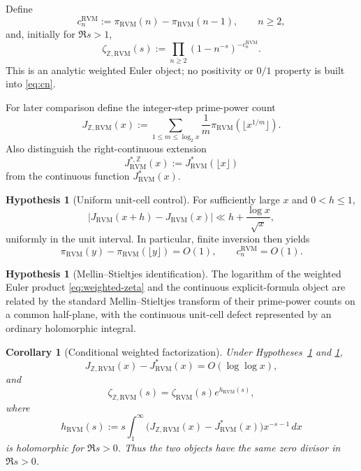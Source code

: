 \documentclass[11pt,reqno]{amsart}
\newtheorem{corollary}[theorem]{Corollary}
\theoremstyle{definition}
\newtheorem{hypothesis}[theorem]{Hypothesis}
\theoremstyle{remark}
\newcommand{\RVM}{\mathrm{RVM}}
\begin{document}
Define
\begin{equation}\label{eq:cn}
 c_n^{\RVM}:=\pi_{\RVM}(n)-\pi_{\RVM}(n-1),
 \qquad n\ge2,
\end{equation}
and, initially for $\Re s>1$,
\begin{equation}\label{eq:weighted-zeta}
 \zeta_{\mathbb Z,\RVM}(s)
 :=\prod_{n\ge2}(1-n^{-s})^{-c_n^{\RVM}}.
\end{equation}
This is an analytic weighted Euler object; no positivity or $0/1$ property is built into \eqref{eq:cn}.

For later comparison define the integer-step prime-power count
\begin{equation}\label{eq:JZ}
 J_{\mathbb Z,\RVM}(x)
 :=\sum_{1\le m\le\log_2x}\frac1m
 \pi_{\RVM}(\lfloor x^{1/m}\rfloor).
\end{equation}
Also distinguish the right-continuous extension
\begin{equation}
 J_{\RVM}^{*,\mathbb Z}(x):=J_{\RVM}^{*}(\lfloor x\rfloor)
\end{equation}
from the continuous function $J_{\RVM}^{*}(x)$.

\begin{hypothesis}[Uniform unit-cell control]\label{hyp:unit-cell}
For sufficiently large $x$ and $0<h\le1$,
\begin{equation}\label{eq:unit-cell}
 |J_{\RVM}(x+h)-J_{\RVM}(x)|
 \ll h+\frac{\log x}{\sqrt x},
\end{equation}
uniformly in the unit interval.  In particular, finite inversion then yields
\begin{equation}
 \pi_{\RVM}(y)-\pi_{\RVM}(\lfloor y\rfloor)=O(1),
 \qquad c_n^{\RVM}=O(1).
\end{equation}
\end{hypothesis}

\begin{hypothesis}[Mellin--Stieltjes identification]\label{hyp:MS}
The logarithm of the weighted Euler product \eqref{eq:weighted-zeta} and the continuous explicit-formula object are related by the standard Mellin--Stieltjes transform of their prime-power counts on a common half-plane, with the continuous unit-cell defect represented by an ordinary holomorphic integral.
\end{hypothesis}

\begin{corollary}[Conditional weighted factorization]\label{cor:weighted-factorization}
Under Hypotheses~\ref{hyp:unit-cell} and \ref{hyp:MS},
\begin{equation}\label{eq:JZ-diff}
 J_{\mathbb Z,\RVM}(x)-J_{\RVM}^{*}(x)=O(\log\log x),
\end{equation}
and
\begin{equation}\label{eq:weighted-factorization}
 \boxed{
 \zeta_{\mathbb Z,\RVM}(s)=\zeta_{\RVM}(s)e^{h_{\RVM}(s)},}
\end{equation}
where
\begin{equation}\label{eq:hRVM}
 h_{\RVM}(s)
 :=s\int_1^\infty
 \bigl(J_{\mathbb Z,\RVM}(x)-J_{\RVM}^{*}(x)\bigr)x^{-s-1}\,dx
\end{equation}
is holomorphic for $\Re s>0$.  Thus the two objects have the same zero divisor in $\Re s>0$.
\end{corollary}
\end{document}
